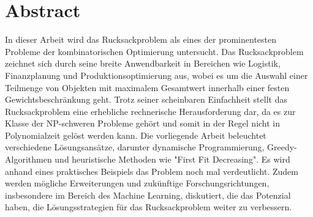 \documentclass[12pt]{report}
\begin{document}
\pagestyle{plain}
\fancyhead{}


\fancyhead[C]{\nouppercase\leftmark}

\renewcommand{\footrulewidth}{0.4pt} %


\renewcommand{\chaptermark}[1]{\markboth{#1}{}} 

\newpage
\chapter*{Abstract}
In dieser Arbeit wird das Rucksackproblem als eines der prominentesten Probleme der kombinatorischen Optimierung untersucht. Das Rucksackproblem zeichnet sich durch seine breite Anwendbarkeit in Bereichen wie Logistik, Finanzplanung und Produktionsoptimierung aus, wobei es um die Auswahl einer Teilmenge von Objekten mit maximalem Gesamtwert innerhalb einer festen Gewichtsbeschränkung geht. Trotz seiner scheinbaren Einfachheit stellt das Rucksackproblem eine erhebliche rechnerische Herausforderung dar, da es zur Klasse der NP-schweren Probleme gehört und somit in der Regel nicht in Polynomialzeit gelöst werden kann. Die vorliegende Arbeit beleuchtet verschiedene Lösungsansätze, darunter dynamische Programmierung, Greedy-Algorithmen und heuristische Methoden wie "First Fit Decreasing". Es wird anhand eines praktisches Beispiels das Problem noch mal verdeutlicht. Zudem werden mögliche Erweiterungen und zukünftige Forschungsrichtungen, insbesondere im Bereich des Machine Learning, diskutiert, die das Potenzial haben, die Lösungsstrategien für das Rucksackproblem weiter zu verbessern.
\newpage
\end{document}
